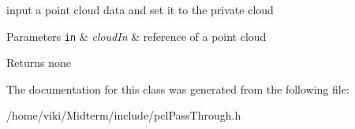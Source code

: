 input a point cloud data and set it to the private cloud 


\begin{DoxyParams}[1]{Parameters}
\mbox{\tt in}  & {\em cloud\+In} & reference of a point cloud \\
\hline
\end{DoxyParams}
\begin{DoxyReturn}{Returns}
none 
\end{DoxyReturn}


The documentation for this class was generated from the following file\+:\begin{DoxyCompactItemize}
\item 
/home/viki/\+Midterm/include/pcl\+Pass\+Through.\+h\end{DoxyCompactItemize}
